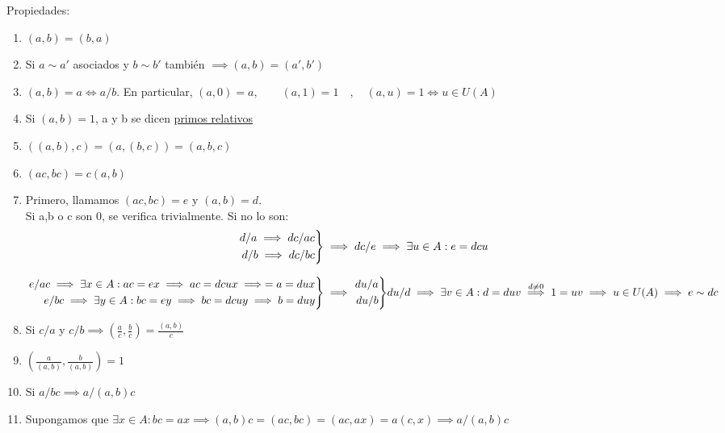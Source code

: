 \documentclass[11pt, a4paper, titlepage]{article}
\makeatletter
\renewenvironment{proof}[1][\proofname] {\vspace{-15pt}\par\pushQED{\qed}\normalfont\topsep6\p@\@plus6\p@\relax\trivlist\item[\hskip\labelsep\it#1\@addpunct{.}]\ignorespaces}{\popQED\endtrivlist\@endpefalse}
\theoremstyle{theorem-style}
\theoremstyle{definition-style}
\theoremstyle{remark-style}
\theoremstyle{example-style}
\newenvironment{nlist}
{\begin{enumerate}
\renewcommand\labelenumi{(\emph{\roman{enumi})}}}
{\end{enumerate}}
\newenvironment{rcases}
  {\left.\begin{aligned}}
  {\end{aligned}\right\rbrace}
\makeatother
\begin{document}
Propiedades:
\begin{nlist}

	\item $(a,b) = (b,a)$
	
	\item Si $a \sim a'$ asociados y $b \sim b'$ también $\implies (a,b) = (a',b')$
	
	\item $(a,b) = a \iff a/b$. En particular, $(a,0) = a, \quad  \quad (a,1) = 1 \quad, \quad (a,u) = 1 \iff u \in U(A)$
	
	\item Si $(a,b) = 1$, a y b se dicen \underline{primos relativos}
	
	\item $((a,b),c) = (a,(b,c)) = (a,b,c)$
	\item $(ac,bc) = c(a,b)$\\
	\begin{proof}
	Primero, llamamos $(ac,bc) = e$ y $(a,b) = d$.\\
	Si a,b o c son 0, se verifica trivialmente. Si no lo son:\\
	\[
	\begin{rcases}
	d/a \implies dc/ac\\
	d/b \implies dc/bc\\
\end{rcases} \implies dc/e \implies \exists u \in A : e = dcu
	\]
	
	$\begin{rcases}e / ac \implies \exists x \in A : ac = ex \implies ac = dcux \implies = a = dux\\
	e/bc\implies \exists y \in A : bc = ey \implies bc = dcuy \implies b = duy\end{rcases} \implies \begin{rcases}du/a\\du/b\end{rcases} du/d \\\implies \exists v \in A : d = duv \stackrel{d\ne 0}{\implies} 1=uv \implies u\in U(A) \implies e \sim  dc$

	
\end{proof}

	\item Si $c/a$ y $c/b\implies (\frac{a}{c},\frac{b}{c}) =  \frac{(a,b)}{c}$
	
	\item
	$(\frac{a}{(a,b)}, \frac{b}{(a,b)}) = 1$
	
	\item Si $a/bc \implies a/(a,b)c$\\
	\begin{proof}
	Supongamos que $\exists x \in A : bc = ax  \implies (a,b)c = (ac,bc) = (ac,ax) = a(c,x) \implies a/(a,b)c$
	

\end{proof}
\end{nlist}
\end{document}
